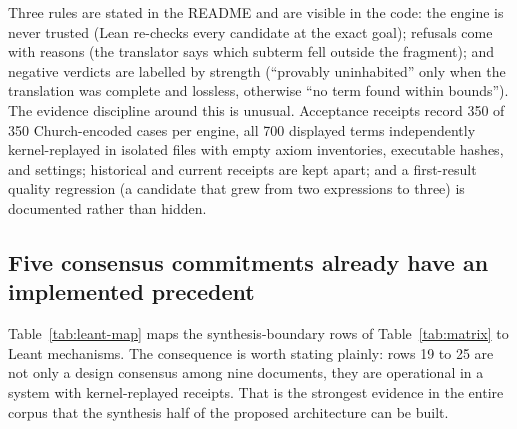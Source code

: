 \documentclass[11pt,a4paper]{article}
\newcommand{\code}[1]{\texttt{\detokenize{#1}}}
\theoremstyle{definition}
\begin{document}
Three rules are stated in the README and are visible in the code: the engine is never trusted (Lean re-checks every candidate at the exact goal); refusals come with reasons (the translator says which subterm fell outside the fragment); and negative verdicts are labelled by strength (``provably uninhabited'' only when the translation was complete and lossless, otherwise ``no term found within bounds''). The evidence discipline around this is unusual. Acceptance receipts record 350 of 350 Church-encoded cases per engine, all 700 displayed terms independently kernel-replayed in isolated files with empty axiom inventories, executable hashes, and settings; historical and current receipts are kept apart; and a first-result quality regression (a candidate that grew from two \code{match} expressions to three) is documented rather than hidden.

\subsection{Five consensus commitments already have an implemented precedent}
Table~\ref{tab:leant-map} maps the synthesis-boundary rows of Table~\ref{tab:matrix} to Leant mechanisms. The consequence is worth stating plainly: rows 19 to 25 are not only a design consensus among nine documents, they are operational in a system with kernel-replayed receipts. That is the strongest evidence in the entire corpus that the synthesis half of the proposed architecture can be built.
\end{document}
